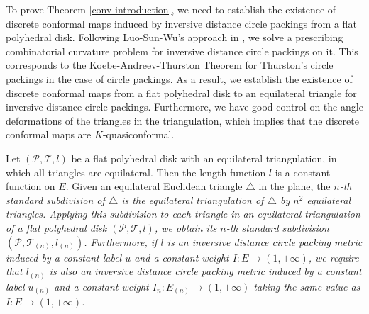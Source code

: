 \documentclass[12pt]{amsart}
\def\T{\mathcal{T}}
\begin{document}
To prove Theorem \ref{conv introduction}, we need to establish the existence of discrete conformal maps induced by inversive distance circle packings from a flat polyhedral disk. Following Luo-Sun-Wu's approach in \cite{LSW},
we solve a prescribing combinatorial curvature problem for inversive distance circle packings on it.
This corresponds to the Koebe-Andreev-Thurston Theorem for Thurston's circle packings in the case of circle packings.
As a result, we establish the existence of discrete conformal maps from a flat polyhedral disk to an equilateral triangle for inversive distance circle packings. Furthermore, we have good control on the angle deformations of the triangles in the triangulation, which implies that the discrete conformal maps are $K$-quasiconformal.






Let  $(\mathcal P, \T, l)$ be a flat  polyhedral disk with an equilateral triangulation,  in which all triangles are equilateral. Then the length function $l$ is a constant function on $E$. Given an equilateral Euclidean triangle $\triangle$ in the plane, the \it $n$-th standard subdivision \rm of $\triangle$ is the equilateral triangulation of $\triangle$ by $n^2$ equilateral triangles. Applying this subdivision to each triangle in an equilateral triangulation of a flat polyhedral disk $(\mathcal P, \T, l)$, we obtain its \it $n$-th standard subdivision \rm  $(\mathcal P, \T_{(n)}, l_{(n)})$.
Furthermore, if $l$ is an inversive distance circle packing metric induced by a constant label $u$ and a constant weight $I: E\rightarrow (1, +\infty)$, we require that $l_{(n)}$ is also an inversive distance circle packing metric induced by a constant label $u_{(n)}$ and
a constant weight $I_n: E_{(n)}\rightarrow (1, +\infty)$ taking the same value as $I: E\rightarrow (1, +\infty)$.
\end{document}

